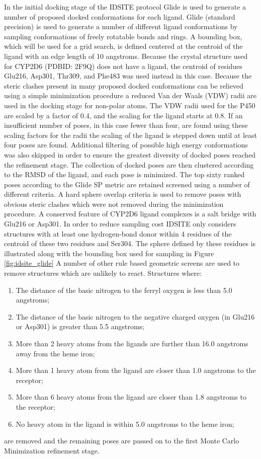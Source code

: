 In the initial docking stage of the IDSITE protocol Glide is used to generate a number of proposed docked conformations for each ligand.
Glide (standard precision) is used to generate a number of different ligand conformations by sampling conformations of freely rotatable bonds and rings.
A bounding box, which will be used for a grid search, is defined centered at the centroid of the ligand with an edge length of 10 angstroms.
Because the crystal structure used for CYP2D6 (PDBID: 2F9Q) does not have a ligand, the centroid of residues Glu216, Asp301, Thr309, and Phe483 was used instead in this case.
Because the steric clashes present in many proposed docked conformations can be relieved using a simple minimization procedure a reduced Van der Waals (VDW) radii are used in the docking stage for non-polar atoms.
The VDW radii used for the P450 are scaled by a factor of 0.4, and the scaling for the ligand starts at 0.8.
If an insufficient number of poses, in this case fewer than four, are found using these scaling factors for the radii the scaling of the ligand is stepped down until at least four poses are found.
Additional filtering of possible high energy conformations was also skipped in order to ensure the greatest diversity of docked poses reached the refinement stage.
The collection of docked poses are then clustered according to the RMSD of the ligand, and each pose is minimized.
The top sixty ranked poses according to the Glide SP metric are retained screened using a number of different criteria.
A hard sphere overlap criteria is used to remove poses with obvious steric clashes which were not removed during the minimization procedure.
A conserved feature of CYP2D6 ligand complexes is a salt bridge with Glu216 or Asp301.
In order to reduce sampling cost IDSITE only considers structures with at least one hydrogen-bond donor within 4 residues of the centroid of these two residues and Ser304.
The sphere defined by these residues is illustrated along with the bounding box used for sampling in Figure \ref{fig:idsite_glide}
A number of other rule based geometric screens are used to remove structures which are unlikely to react.
Structures where:
\begin{enumerate}
\item The distance of the basic nitrogen to the ferryl oxygen is less than 5.0 angstroms;
\item The distance of the basic nitrogen to the negative charged oxygen (in Glu216 or Asp301) is greater than 5.5 angstroms;
\item More than 2 heavy atoms from the ligands are further than 16.0 angstroms away from the heme iron;
\item More than 1 heavy atom from the ligand are closer than 1.0 angstroms to the receptor;
\item More than 6 heavy atoms from the ligand are closer than 1.8 angstroms to the receptor;
\item No heavy atom in the ligand is within 5.0 angstroms to the heme iron;
\end{enumerate}
are removed and the remaining poses are passed on to the first Monte Carlo Minimization refinement stage.

